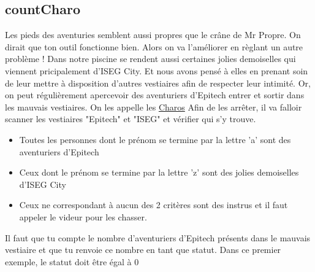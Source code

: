 \documentclass[a4paper, 12pt]{article}
\begin{document}
{    


    \vspace{3cm}

    \subsection{countCharo}

    Les pieds des aventuries semblent aussi propres que le crâne de Mr Propre.
    On dirait que ton outil fonctionne bien. Alors on va l'améliorer en règlant
    un autre problème !
    \newline \newline
    Dans notre piscine se rendent aussi certaines jolies demoiselles qui viennent pricipalement
    d'ISEG City. Et nous avons pensé à elles en prenant soin de leur mettre à disposition d'autres vestiaires
    afin de respecter leur intimité. Or, on peut régulièrement apercevoir des aventuriers d'Epitech
    entrer et sortir dans les mauvais vestiaires.
    \newline \newline
    On les appelle les \underline{Charos}
    \newline \newline
    Afin de les arrêter, il va falloir scanner les vestiaires "Epitech" et "ISEG" et vérifier qui s'y trouve.
    \newline
    \begin{itemize}
        \item Toutes les personnes dont le prénom se termine par la lettre 'a' sont des aventuriers d'Epitech
        \item Ceux dont le prénom se termine par la lettre 'z' sont des jolies demoiselles d'ISEG City
        \item Ceux ne correspondant à aucun des 2 critères sont des instrus et il faut appeler le videur pour les chasser.
    \end{itemize}

    \vspace{0.6cm}

    Il faut que tu compte le nombre d'aventuriers d'Epitech présents dans le mauvais vestiaire et que
    tu renvoie ce nombre en tant que statut.
    \newline \newline
    Dans ce premier exemple, le statut doit être égal à 0

}
\end{document}
